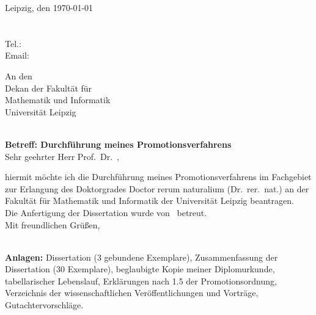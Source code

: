 \begin{flushleft}
\me        \hfill Leipzig, den \today\\ 
\mystreet\\ 
\mycity \\
Tel.: \mytel \\
Email: \myemail

\end{flushleft}
\vspace*{0.2cm}
\begin{flushleft}
An den\\
Dekan der Fakult\"at f\"ur\\ 
Mathematik und Informatik\\
Universit\"at Leipzig\\
\facultystreet\\ 
\facultycity
\end{flushleft}

{\bf Betreff: Durchf\"uhrung meines Promotionsverfahrens}\\

Sehr geehrter Herr Prof.\ Dr.\ \thedean,

hiermit m\"ochte ich die Durchf\"uhrung meines Promotionsverfahrens im Fachgebiet \department zur Erlangung des Doktorgrades Doctor rerum naturalium (Dr.\ rer.\ nat.) an der Fakult\"at f\"ur Mathematik und Informatik der Universit\"at Leipzig beantragen. \\[.2cm]
Die Anfertigung der Dissertation wurde von \mysupervisor\ betreut. \\

Mit freundlichen Gr\"u\ss en,
\vspace{2cm}

\me \\
 
{\bf Anlagen:} Dissertation (3 gebundene Exemplare), Zusammenfassung
der Dissertation (30 Exemplare), beglaubigte Kopie meiner Diplomurkunde,
tabellarischer Lebenslauf, Erkl\"arungen nach  1.5 der
Promotionsordnung, Verzeichnis der wissenschaftlichen Ver\"offentlichungen und Vortr\"age, Gutachtervorschl\"age.


